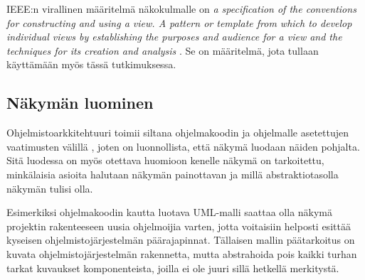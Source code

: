 \documentclass[finnish]{tktltiki2}
\theoremstyle{definition}
\theoremstyle{remark}
\begin{document}
IEEE:n virallinen määritelmä näkokulmalle on \textit{a specification of the conventions for constructing and using a view. A pattern or template
from which to develop individual views by establishing the purposes and audience for a view and the techniques for its creation and analysis} \citep[s. 4]{ieee_2000}. Se on määritelmä, jota tullaan käyttämään myös tässä tutkimuksessa.





\subsection{Näkymän luominen}

Ohjelmistoarkkitehtuuri toimii siltana ohjelmakoodin ja ohjelmalle asetettujen vaatimusten välillä \citep[s. 94]{Garlan:2000:SAR:336512.336537}, joten on luonnollista, että näkymä luodaan näiden pohjalta. Sitä luodessa on myös otettava huomioon kenelle näkymä on tarkoitettu, minkälaisia asioita halutaan näkymän painottavan ja millä abstraktiotasolla näkymän tulisi olla. 

Esimerkiksi ohjelmakoodin kautta luotava UML-malli saattaa olla näkymä projektin rakenteeseen uusia ohjelmoijia varten, jotta voitaisiin helposti esittää kyseisen ohjelmistojärjestelmän päärajapinnat. Tällaisen mallin päätarkoitus on kuvata ohjelmistojärjestelmän rakennetta, mutta abstrahoida pois kaikki turhan tarkat kuvaukset komponenteista, joilla ei ole juuri sillä hetkellä merkitystä. 
\end{document}
